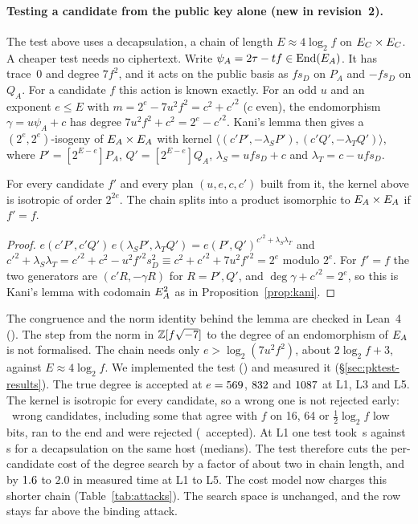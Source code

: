 \paragraph{Testing a candidate from the public key alone (new in revision~2).}
The test above uses a decapsulation, a chain of length $E\approx 4\log_2 f$
on $E_C\times E_C$. A cheaper test needs no ciphertext. Write
$\psi_A=2\tau-tf\in\operatorname{End}(E_A)$. It has trace~0 and degree $7f^2$, and it acts on
the public basis as $f s_D$ on $P_A$ and $-fs_D$ on $Q_A$. For a candidate $f$
this action is known exactly. For an odd $u$ and an exponent $e\le E$ with
$m=2^e-7u^2f^2=c^2+c'^2$ ($c$ even), the endomorphism $\gamma=u\psi_A+c$ has
degree $7u^2f^2+c^2=2^e-c'^2$. Kani's lemma then gives a $(2^e,2^e)$-isogeny
of $E_A\times E_A$ with kernel
$\langle(c'P',-\lambda_SP'),(c'Q',-\lambda_TQ')\rangle$, where
$P'=[2^{E-e}]P_A$, $Q'=[2^{E-e}]Q_A$, $\lambda_S=ufs_D+c$ and
$\lambda_T=c-ufs_D$.

\begin{lemma}\label{lem:pktest}
For every candidate $f'$ and every plan $(u,e,c,c')$ built from it, the
kernel above is isotropic of order $2^{2e}$. The chain splits into a product
isomorphic to $E_A\times E_A$ if $f'=f$.
\end{lemma}

\begin{proof}
$e(c'P',c'Q')\,e(\lambda_SP',\lambda_TQ')=e(P',Q')^{c'^2+\lambda_S\lambda_T}$
and $c'^2+\lambda_S\lambda_T=c'^2+c^2-u^2f'^2s_D^2\equiv c^2+c'^2+7u^2f'^2=2^e$
modulo $2^e$. For $f'=f$ the two generators are $(c'R,-\gamma R)$ for $R=P',Q'$,
and $\deg\gamma+c'^2=2^e$, so this is Kani's lemma with codomain $E_A^2$ as in
Proposition~\ref{prop:kani}.
\end{proof}

The congruence and the norm identity behind the lemma are checked in Lean~4
().
The step from the norm in $\mathbb{Z}[f\sqrt{-7}]$ to the degree of an endomorphism of
$E_A$ is not formalised. The chain needs only $e>\log_2(7u^2f^2)$, about
$2\log_2f+3$, against $E\approx 4\log_2f$. We implemented the test
() and measured it
(\S\ref{sec:pktest-results}). The true degree is accepted at $e=569$,
$832$ and $1087$ at L1, L3 and L5. The kernel is isotropic for
every candidate, so a wrong one is not rejected early: \PkWrongTested\
wrong candidates, including some that agree with $f$ on 16, 64 or
$\tfrac12\log_2 f$ low bits, ran to the end and were rejected
(\PkWrongAccepted\ accepted). At L1 one test took \PkTimeOne\,s against
\DecTimeOne\,s for a decapsulation on the same host (medians). The test therefore cuts the
per-candidate cost of the degree search by a factor of about two in chain
length, and by $1.6$ to $2.0$ in measured time at L1 to L5. The cost model now charges
this shorter chain (Table~\ref{tab:attacks}). The search space is unchanged,
and the row stays far above the binding attack.

